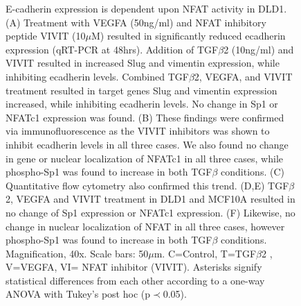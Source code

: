 \documentclass[11pt,letterpaper]{article}
\begin{document}
\begin{figure}
\caption{E-cadherin expression is dependent upon NFAT activity in DLD1.
(A) Treatment with VEGFA (50ng/ml) and NFAT inhibitory peptide VIVIT (10$\mu$M) resulted in significantly reduced ecadherin expression (qRT-PCR at 48hrs).
Addition of TGF$\beta$2 (10ng/ml) and VIVIT resulted in increased Slug and vimentin expression, while inhibiting ecadherin levels.
Combined TGF$\beta$2, VEGFA, and VIVIT treatment resulted in target genes Slug and vimentin expression increased, while inhibiting ecadherin levels.
No change in Sp1 or NFATc1 expression was found.
(B) These findings were confirmed via immunofluorescence as the VIVIT inhibitors was shown to inhibit ecadherin levels in all three cases.
We also found no change in gene or nuclear localization of NFATc1 in all three cases, while phospho-Sp1 was found to increase in both TGF$\beta$ conditions.
(C) Quantitative flow cytometry also confirmed this trend.
(D,E)  TGF$\beta$2, VEGFA and VIVIT treatment in DLD1 and MCF10A resulted in no change of Sp1 expression or NFATc1 expression.
(F)  Likewise, no change in nuclear localization of NFAT in all three cases, however phospho-Sp1 was found to increase in both TGF$\beta$ conditions.
Magnification, 40x. Scale bars: 50$\mu$m.  C=Control, T=TGF$\beta$2 , V=VEGFA, VI= NFAT inhibitor (VIVIT).
Asterisks signify statistical differences from each other according to a one-way ANOVA with Tukey's post hoc (p$\prec$0.05).}\label{fg:S5}
\end{figure}

\newpage
%
\end{document}
